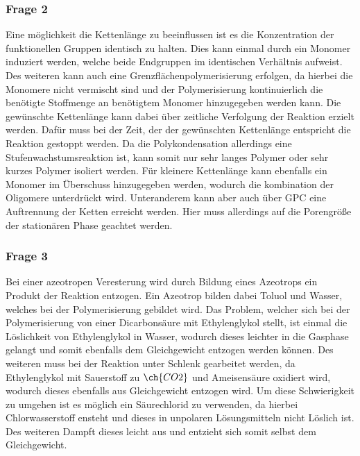 \documentclass[10pt,a4paper,ngerman]{scrartcl}
\begin{document}
		\subsubsection{Frage 2}

			Eine möglichkeit die Kettenlänge zu beeinflussen ist es die Konzentration der funktionellen Gruppen identisch zu halten. Dies kann einmal durch ein Monomer 
			induziert werden, welche beide Endgruppen im identischen Verhältnis aufweist. Des weiteren kann auch eine Grenzflächenpolymerisierung erfolgen, da hierbei
			die Monomere nicht vermischt sind und der Polymerisierung kontinuierlich die benötigte Stoffmenge an benötigtem Monomer hinzugegeben werden kann. Die 
			gewünschte Kettenlänge kann dabei über zeitliche Verfolgung der Reaktion erzielt werden. Dafür muss bei der Zeit, der der gewünschten Kettenlänge entspricht
			die Reaktion gestoppt werden. Da die Polykondensation allerdings eine Stufenwachstumsreaktion ist, kann somit nur sehr langes Polymer oder sehr kurzes Polymer 
			isoliert werden. Für kleinere Kettenlänge kann ebenfalls ein Monomer im Überschuss hinzugegeben werden, wodurch die kombination der Oligomere unterdrückt wird.
			Unteranderem kann aber auch über GPC eine Auftrennung der Ketten erreicht werden. Hier muss allerdings auf die Porengröße der stationären Phase geachtet werden.


		\subsubsection{Frage 3}

			Bei einer azeotropen Veresterung wird durch Bildung eines Azeotrops ein Produkt der Reaktion entzogen. Ein Azeotrop bilden dabei Toluol und Wasser, welches 
			bei der Polymerisierung gebildet wird. Das Problem, welcher sich bei der Polymerisierung von einer Dicarbonsäure mit Ethylenglykol stellt, ist einmal die 
			Löslichkeit von Ethylenglykol in Wasser, wodurch dieses leichter in die Gasphase gelangt und somit ebenfalls dem Gleichgewicht entzogen werden können.
			Des weiteren muss bei der Reaktion unter Schlenk gearbeitet werden, da Ethylenglykol mit Sauerstoff zu $\ch{CO2}$ und Ameisensäure oxidiert wird, wodurch 
			dieses ebenfalls aus Gleichgewicht entzogen wird. Um diese Schwierigkeit zu umgehen ist es möglich ein Säurechlorid zu verwenden, da hierbei Chlorwasserstoff 
			ensteht und dieses in unpolaren Lösungsmitteln nicht Löslich ist. Des weiteren Dampft dieses leicht aus und entzieht sich somit selbst dem Gleichgewicht.
\end{document}
